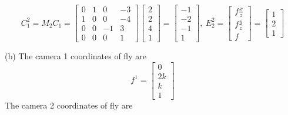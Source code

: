 \documentclass[12pt]{article}
\begin{document}
\begin{equation*}
C_1^2 = M_2C_1 = \left[ \begin{array}{cccc}
0 & 1 & 0 & -3\\
1 & 0 & 0 & -4\\
0 & 0 & -1 & 3\\
0 & 0 & 0 & 1
\end{array} \right] \left[ \begin{array}{c}
2\\
2\\
4\\
1
\end{array} \right] = \left[ \begin{array}{c}
-1\\
-2\\
-1\\
1
\end{array} \right], \ E_2^2 = \left[ \begin{array}{c}
f\frac{x}{z}\\
f\frac{y}{z}\\
f
\end{array} \right]  = \left[ \begin{array}{c}
1\\
2\\
1
\end{array} \right]
\end{equation*}


\noindent (b) The camera 1 coordinates of fly are 
\begin{equation*}
f^1 =  \left[ \begin{array}{c}
0\\
2k\\
k\\
1
\end{array} \right]
\end{equation*}
The camera 2 coordinates of fly are 
\end{document}
